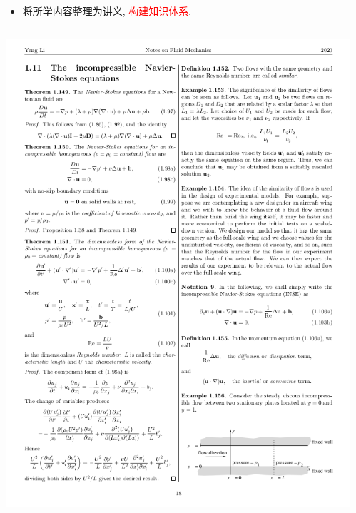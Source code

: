 \documentclass{beamer}
\begin{document}
\begin{CJK*}{UTF8}{gkai}
  \begin{frame}
    \begin{itemize}
    \item
      将所学内容整理为讲义,
      \textcolor{red}{构建知识体系}.
    \end{itemize}
    \begin{columns}
      \begin{column}{.5\linewidth}
        \begin{center}
          \includegraphics[scale=0.22]{./png/fmnotes}
        \end{center}
      \end{column}
      \begin{column}{.5\linewidth}
        \begin{center}

\end{center}
\end{column}
\end{columns}
\end{frame}
\end{CJK*}
\end{document}
